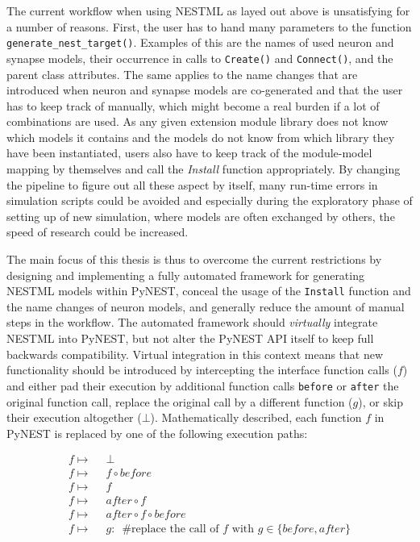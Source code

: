 The current workflow when using NESTML as layed out above is unsatisfying for a number of reasons. First, the user has to hand many parameters to the function \texttt{generate\_nest\_target()}. Examples of this are the names of used neuron and synapse models, their occurrence in calls to \texttt{Create()} and \texttt{Connect()}, and the parent class attributes. The same applies to the name changes that are introduced when neuron and synapse models are co-generated and that the user has to keep track of manually, which might become a real burden if a lot of combinations are used. As any given extension module library does not know which models it contains and the models do not know from which library they have been instantiated, users also have to keep track of the module-model mapping by themselves and call the \emph{Install} function appropriately. By changing the pipeline to figure out all these aspect by itself, many run-time errors in simulation scripts could be avoided and especially during the exploratory phase of setting up of new simulation, where models are often exchanged by others, the speed of research could be increased.

The main focus of this thesis is thus to overcome the current restrictions by designing and implementing a fully automated framework for generating NESTML models within PyNEST, conceal the usage of the \texttt{Install} function and the name changes of neuron models, and generally reduce the amount of manual steps in the workflow. The automated framework should \emph{virtually} integrate NESTML into PyNEST, but not alter the PyNEST API itself to keep full backwards compatibility. Virtual integration in this context means that new functionality should be introduced by intercepting the interface function calls ($f$) and either pad their execution by additional function calls \texttt{before} or \texttt{after} the original function call, replace the original call by a different function ($g$), or skip their execution altogether ($\bot$). Mathematically described, each function $f$ in PyNEST is replaced by one of the following execution paths:

\begin{align*}
  f \mapsto & \enspace\bot                                                                       \\
  f \mapsto & \enspace f \circ before                                                                   \\
  f \mapsto & \enspace f                                                                                \\
  f \mapsto & \enspace after \circ f                                                                    \\
  f \mapsto & \enspace after \circ f \circ before                                                       \\
  f \mapsto & \enspace g:\enspace \text{\#replace the call of } f \text{ with } g \in \{before, after\} \\
\end{align*}

